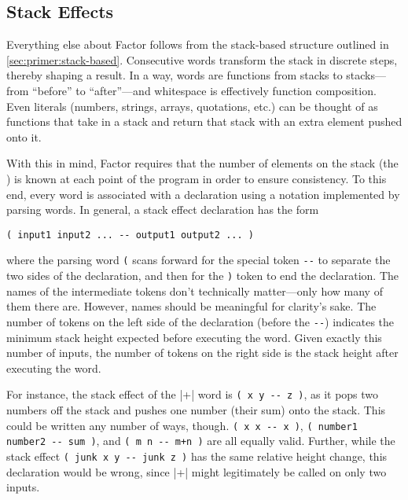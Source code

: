 \subsection{Stack Effects}\label{sec:primer:effects}

Everything else about Factor follows from the stack-based structure outlined in
\cref{sec:primer:stack-based}.  Consecutive words transform the stack in
discrete steps, thereby shaping a result.  In a way, words are functions from
stacks to stacks---from ``before'' to ``after''---and whitespace is effectively
function composition.  Even literals (numbers, strings, arrays, quotations,
etc.) can be thought of as functions that take in a stack and return that stack
with an extra element pushed onto it.

With this in mind, Factor requires that the number of elements on the stack
(the ) is known at each point of the program in order to
ensure consistency.  To this end, every word is associated with a  declaration using a notation implemented by parsing words.  In general,
a stack effect declaration has the form
%
\begin{center} \Verb|( input1 input2 ... -- output1 output2 ... )| \end{center}
%
\noindent where the parsing word \Verb|(| scans forward for the special token
\Verb|--| to separate the two sides of the declaration, and then for the
\Verb|)| token to end the declaration.  The names of the intermediate tokens
don't technically matter---only how many of them there are.  However, names
should be meaningful for clarity's sake.  The number of tokens on the left side
of the declaration (before the \Verb|--|) indicates the minimum stack height
expected before executing the word.  Given exactly this number of inputs, the
number of tokens on the right side is the stack height after executing the
word.

For instance, the stack effect of the \factor|+| word is
%
\Verb|( x y -- z )|,
%
as it pops two numbers off the stack and pushes one number (their sum) onto the
stack.  This could be written any number of ways, though.
%
\Verb|( x x -- x )|,
%
\Verb|( number1 number2 -- sum )|,
%
and
%
\Verb|( m n -- m+n )|
%
are all equally valid.  Further, while the stack effect
%
\Verb|( junk x y -- junk z )|
%
has the same relative height change, this declaration would be wrong, since
\factor|+| might legitimately be called on only two inputs.


